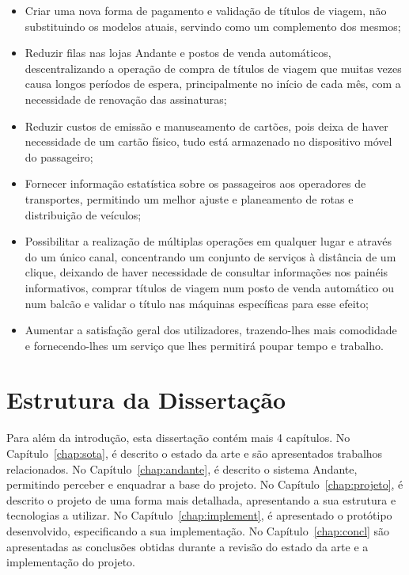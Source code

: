 \begin{itemize}
\item Criar uma nova forma de pagamento e validação de títulos de viagem, não substituindo os modelos atuais, servindo como um complemento dos mesmos;
\item Reduzir filas nas lojas Andante e postos de venda automáticos, descentralizando a operação de compra de títulos de viagem que muitas vezes causa longos períodos de espera, principalmente no início de cada mês, com a necessidade de renovação das assinaturas;
\item Reduzir custos de emissão e manuseamento de cartões, pois deixa de haver necessidade de um cartão físico, tudo está armazenado no dispositivo móvel do passageiro;
\item Fornecer informação estatística sobre os passageiros aos operadores de transportes, permitindo um melhor ajuste e planeamento de rotas e distribuição de veículos;
\item Possibilitar a realização de múltiplas operações em qualquer lugar e através do um único canal, concentrando um conjunto de serviços à distância de um clique, deixando de haver necessidade de consultar informações nos painéis informativos, comprar títulos de viagem num posto de venda automático ou num balcão e validar o título nas máquinas específicas para esse efeito;
\item Aumentar a satisfação geral dos utilizadores, trazendo-lhes mais comodidade e fornecendo-lhes um serviço que lhes permitirá poupar tempo e trabalho.
\end{itemize}

\section{Estrutura da Dissertação} \label{sec:struct}

Para além da introdução, esta dissertação contém mais 4 capítulos.
No Capítulo~\ref{chap:sota}, é descrito o estado da arte e são apresentados trabalhos relacionados. 
No Capítulo~\ref{chap:andante}, é descrito o sistema Andante, permitindo perceber e enquadrar a base do projeto.
No Capítulo~\ref{chap:projeto}, é descrito o projeto de uma forma mais detalhada, apresentando a sua estrutura e tecnologias a utilizar.
No Capítulo~\ref{chap:implement}, é apresentado o protótipo desenvolvido, especificando a sua implementação.
No Capítulo~\ref{chap:concl} são apresentadas as conclusões obtidas durante a revisão do estado da arte e a implementação do projeto.